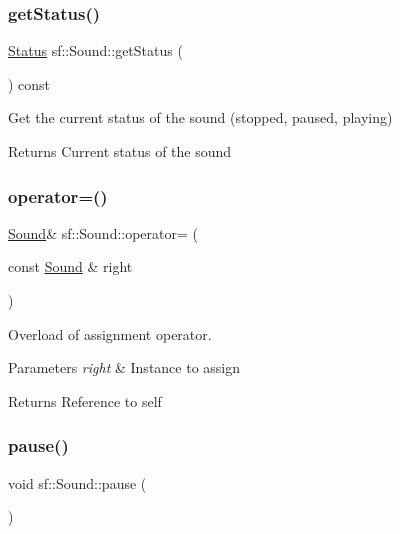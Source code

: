 \subsubsection{\texorpdfstring{get\+Status()}{getStatus()}}
{\footnotesize\ttfamily \hyperlink{classsf_1_1_sound_source_ac43af72c98c077500b239bc75b812f03}{Status} sf\+::\+Sound\+::get\+Status (\begin{DoxyParamCaption}{ }\end{DoxyParamCaption}) const}



Get the current status of the sound (stopped, paused, playing) 

\begin{DoxyReturn}{Returns}
Current status of the sound 
\end{DoxyReturn}
\mbox{\label{classsf_1_1_sound_a08c64c9c1dabeebc59fbf2540d81d4dd}} 
\subsubsection{\texorpdfstring{operator=()}{operator=()}}
{\footnotesize\ttfamily \hyperlink{classsf_1_1_sound}{Sound}\& sf\+::\+Sound\+::operator= (\begin{DoxyParamCaption}\item[{const \hyperlink{classsf_1_1_sound}{Sound} \&}]{right }\end{DoxyParamCaption})}



Overload of assignment operator. 


\begin{DoxyParams}{Parameters}
{\em right} & Instance to assign\\
\hline
\end{DoxyParams}
\begin{DoxyReturn}{Returns}
Reference to self 
\end{DoxyReturn}
\mbox{\label{classsf_1_1_sound_a5eeb25815bfa8cdc4a6cc000b7b19ad5}} 
\subsubsection{\texorpdfstring{pause()}{pause()}}
{\footnotesize\ttfamily void sf\+::\+Sound\+::pause (\begin{DoxyParamCaption}{ }\end{DoxyParamCaption})}



